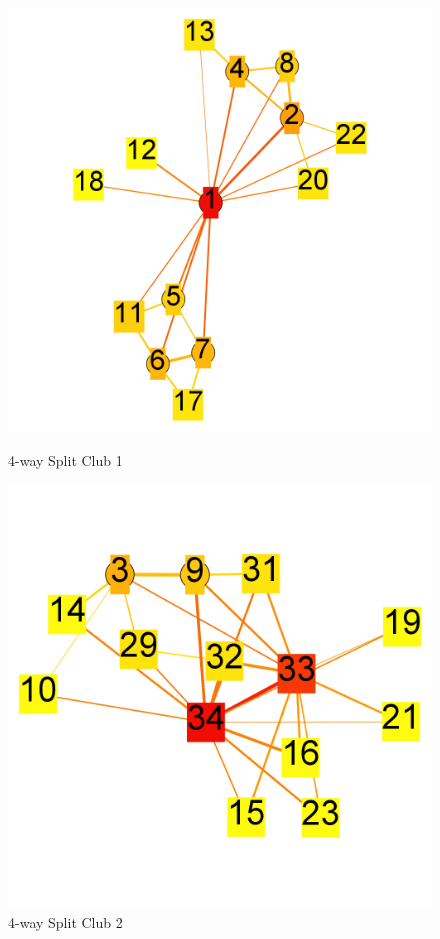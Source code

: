 \documentclass[paper=a4, fontsize=11pt]{scrartcl} %
\numberwithin{equation}{section} %
\numberwithin{figure}{section} %
\numberwithin{table}{section} %
\begin{document}
\begin{figure}[H]
\centering
\begin{minipage}{.5\textwidth}
  \centering
\includegraphics[width=1\textwidth]{4clubs/club1}
\caption{4-way Split Club 1}
\label{fig:4clubs1}
\end{minipage}%
\begin{minipage}{.5\textwidth}
  \centering
\includegraphics[width=1\textwidth]{4clubs/club2}
\caption{4-way Split Club 2}
\label{fig:4clubs2}
\end{minipage}
\end{figure}
\end{document}
